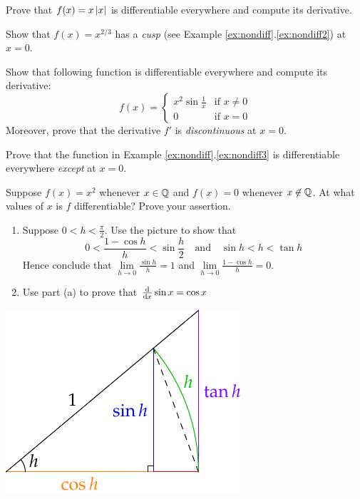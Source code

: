 \begin{exercises}{}
\begin{enumerate}
	  
	  \item Prove that $f(x)=x\left| x\right|$ is differentiable everywhere and compute its derivative.
	  
	  
	  \item Show that $f(x)=x^{2/3}$ has a \emph{cusp} (see Example \ref*{ex:nondiff}.\ref{ex:nondiff2}) at $x=0$.
	  	  
	  
	  \item\label{exs:diffdiscont} Show that following function is differentiable everywhere and compute its derivative:
	  \[
	  	f(x)=
	  	\begin{cases}
	  		x^2\sin\frac 1x&\text{if }x\neq 0\\
	  		0&\text{if }x=0
	  	\end{cases}
	  \]
	  Moreover, prove that the derivative $f'$ is \emph{discontinuous} at $x=0$.
	  
	  
	  \item\label{ex:diffnonzero} Prove that the function in Example \ref*{ex:nondiff}.\ref{ex:nondiff3}
	  is differentiable everywhere \emph{except} at $x=0$.
	  
	  
	  \item Suppose $f(x)=x^2$ whenever $x\in\mathbb{Q}$ and $f(x)=0$ whenever $x\not\in\mathbb{Q}$. At what values of $x$ is $f$ differentiable? Prove your assertion.
	  
	
		\begin{minipage}[t]{0.63\linewidth}\vspace{0pt}
		  \item\label{ex:trigdiff}\begin{enumerate}
		    \item Suppose $0<h<\frac\pi 2$. Use the picture to show that
				\[
					0<\frac{1-\cos h}h< \sin\frac{h}2 
					\quad\text{and}\quad  
					\sin h< h<\tan h
				\]
				Hence conclude that $\lim\limits_{h\to 0}\frac{\sin h}h=1$ and $\lim\limits_{h\to 0}\frac{1-\cos h}h=0$.
			\item Use part (a) to prove that $\frac{\mathrm{d} }{\mathrm{d} x}\sin x=\cos x$
		\end{enumerate}
		\end{minipage}
		\hfill
		\begin{minipage}[t]{0.36\linewidth}\vspace{0pt}
	  	\flushright\includegraphics[scale=0.95]{trig-diff2}
	  \end{minipage}
	  

\end{enumerate}
\end{exercises}
